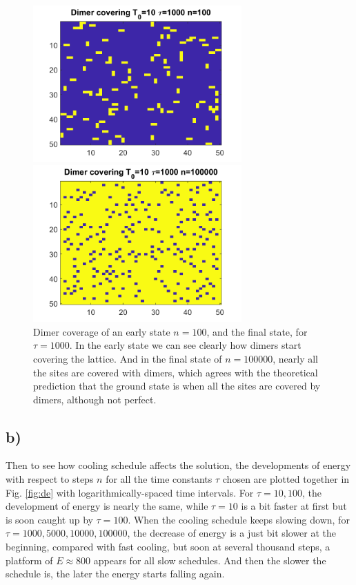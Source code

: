 \documentclass[12pt, graphicx]{article}
\begin{document}
\begin{figure}[ht]
\centering
\begin{minipage}{0.48\linewidth}
\centering
\includegraphics[width = 80mm]{ds.png}
\end{minipage}
\begin{minipage}{0.48\linewidth}
\centering
\includegraphics[width = 80mm]{df.png}
\end{minipage}
\caption{Dimer coverage of an early state $n=100$, and the final state, for $\tau=1000$. In the early state we can see clearly how dimers start covering the lattice. And in the final state of $n=100000$, nearly all the sites are covered with dimers, which agrees with the theoretical prediction that the ground state is when all the sites are covered by dimers, although not perfect.}
\label{fig:d}
\end{figure}

\subsection*{b)}
Then to see how cooling schedule affects the solution, the developments of energy with respect to steps $n$ for all the time constants $\tau$ chosen are plotted together in Fig. \ref{fig:de} with logarithmically-spaced time intervals. For $\tau=10,100$, the development of energy is nearly the same, while $\tau=10$ is a bit faster at first but is soon caught up by $\tau=100$. When the cooling schedule keeps slowing down, for $\tau=1000,5000,10000,100000$, the decrease of energy is a just bit slower at the beginning, compared with fast cooling, but soon at several thousand steps, a platform of $E\approx800$ appears for all slow schedules. And then the slower the schedule is, the later the energy starts falling again.\par
\end{document}
